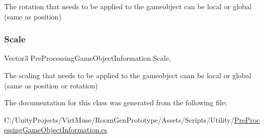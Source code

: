 The rotation that needs to be applied to the gameobject can be local or global (same as position) 

\mbox{\label{class_pre_processing_game_object_information_a92d86eb1e4dd81055f7b04d3d5aaeb4d}} 
\subsubsection{\texorpdfstring{Scale}{Scale}}
{\footnotesize\ttfamily Vector3 Pre\+Processing\+Game\+Object\+Information.\+Scale\hspace{0.3cm}{\ttfamily [get]}, {\ttfamily [set]}}



The scaling that needs to be applied to the gameobject caan be local or global (same as position or rotation) 



The documentation for this class was generated from the following file\+:\begin{DoxyCompactItemize}
\item 
C\+:/\+Unity\+Projects/\+Virt\+Muse/\+Room\+Gen\+Prototype/\+Assets/\+Scripts/\+Utility/\mbox{\hyperlink{_pre_processing_game_object_information_8cs}{Pre\+Processing\+Game\+Object\+Information.\+cs}}\end{DoxyCompactItemize}
